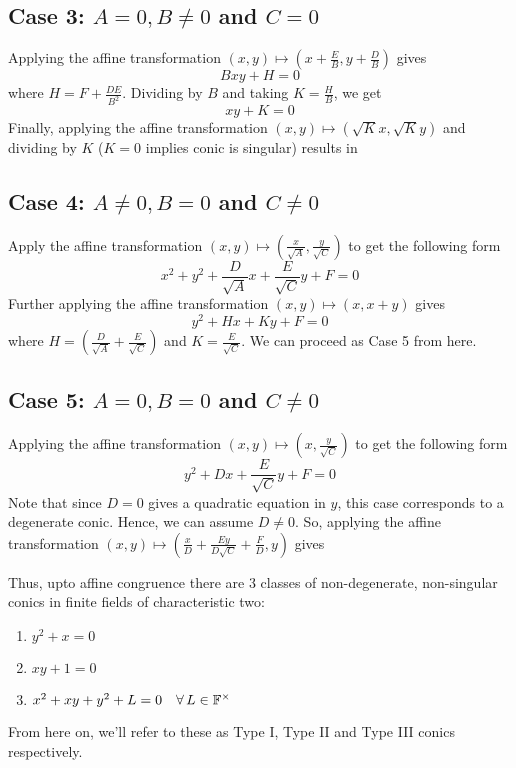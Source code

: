 \subsection*{Case 3: $A = 0, B \neq 0$ and $C = 0$}

Applying the affine transformation
$(x,y)\mapsto\left(x+\frac{E}{B},y+\frac{D}{B}\right)$ gives
\[ Bxy + H = 0 \]
where $H = F + \frac{DE}{B^2}$. Dividing by $B$ and taking $K=\frac{H}{B}$, we get
\[ xy + K = 0\]
Finally, applying the affine transformation $(x,y)\mapsto(\sqrt{K}x,\sqrt{K}y)$
and dividing by $K$ ($K=0$ implies conic is singular) results in

\begin{center}
\end{center}

\subsection*{Case 4: $A \neq 0, B = 0$ and $C \neq 0$}

Apply the affine transformation
$(x,y)\mapsto\left(\frac{x}{\sqrt{A}},\frac{y}{\sqrt{C}}\right)$ to get the
following form
\[ x^2 + y^2 + \frac{D}{\sqrt{A}}x + \frac{E}{\sqrt{C}}y + F = 0 \]
Further applying the affine transformation $(x,y)\mapsto(x,x+y)$ gives
\[ y^2 + Hx + Ky + F = 0 \]
where $H=\left(\frac{D}{\sqrt{A}} + \frac{E}{\sqrt{C}}\right)$ and
$K=\frac{E}{\sqrt{C}}$. We can proceed as Case 5 from here.

\subsection*{Case 5: $A = 0, B = 0$ and $C \neq 0$}

Applying the affine transformation
$(x,y)\mapsto\left(x,\frac{y}{\sqrt{C}}\right)$ to get the
following form
\[ y^2 + Dx + \frac{E}{\sqrt{C}}y + F = 0 \]
Note that since $D=0$ gives a quadratic equation in $y$, this case corresponds to
a degenerate conic. Hence, we can assume $D \neq 0$. So, applying the affine
transformation
$(x,y)\mapsto\left(\frac{x}{D} + \frac{Ey}{D\sqrt{C}} + \frac{F}{D},y\right)$ gives

\begin{center}
\end{center}

\noindent
Thus, upto affine congruence there are 3 classes of non-degenerate, non-singular
conics in finite fields of
characteristic two:
\begin{enumerate}[label=\Roman*.]
    \item $y^2 + x = 0$
    \item $xy + 1 = 0$
    \item $x^2 + xy + y^2 + L = 0\quad\forall\,L\in\mathbb{F}^\times$
\end{enumerate}
From here on, we'll refer to these as Type I, Type II and Type III conics
respectively.
\vspace{1ex}

